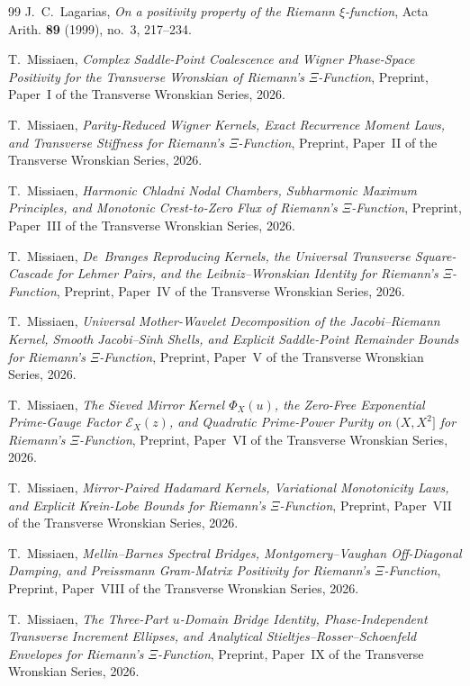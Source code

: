 \documentclass[11pt,reqno]{amsart}
\theoremstyle{definition}
\theoremstyle{remark}
\numberwithin{equation}{section}
\begin{document}
\begin{thebibliography}{99}
J.~C.~Lagarias,
\emph{On a positivity property of the Riemann $\xi$-function},
Acta Arith. \textbf{89} (1999), no.~3, 217--234.

T.~Missiaen,
\emph{Complex Saddle-Point Coalescence and Wigner Phase-Space Positivity for the Transverse Wronskian of Riemann's $\Xi$-Function},
Preprint, Paper~I of the Transverse Wronskian Series, 2026.

T.~Missiaen,
\emph{Parity-Reduced Wigner Kernels, Exact Recurrence Moment Laws, and Transverse Stiffness for Riemann's $\Xi$-Function},
Preprint, Paper~II of the Transverse Wronskian Series, 2026.

T.~Missiaen,
\emph{Harmonic Chladni Nodal Chambers, Subharmonic Maximum Principles, and Monotonic Crest-to-Zero Flux of Riemann's $\Xi$-Function},
Preprint, Paper~III of the Transverse Wronskian Series, 2026.

T.~Missiaen,
\emph{De~Branges Reproducing Kernels, the Universal Transverse Square-Cascade for Lehmer Pairs, and the Leibniz--Wronskian Identity for Riemann's $\Xi$-Function},
Preprint, Paper~IV of the Transverse Wronskian Series, 2026.

T.~Missiaen,
\emph{Universal Mother-Wavelet Decomposition of the Jacobi--Riemann Kernel, Smooth Jacobi--Sinh Shells, and Explicit Saddle-Point Remainder Bounds for Riemann's $\Xi$-Function},
Preprint, Paper~V of the Transverse Wronskian Series, 2026.

T.~Missiaen,
\emph{The Sieved Mirror Kernel $\Phi_X(u)$, the Zero-Free Exponential Prime-Gauge Factor $\mathcal{E}_X(z)$, and Quadratic Prime-Power Purity on $(X, X^2]$ for Riemann's $\Xi$-Function},
Preprint, Paper~VI of the Transverse Wronskian Series, 2026.

T.~Missiaen,
\emph{Mirror-Paired Hadamard Kernels, Variational Monotonicity Laws, and Explicit Krein-Lobe Bounds for Riemann's $\Xi$-Function},
Preprint, Paper~VII of the Transverse Wronskian Series, 2026.

T.~Missiaen,
\emph{Mellin--Barnes Spectral Bridges, Montgomery--Vaughan Off-Diagonal Damping, and Preissmann Gram-Matrix Positivity for Riemann's $\Xi$-Function},
Preprint, Paper~VIII of the Transverse Wronskian Series, 2026.

T.~Missiaen,
\emph{The Three-Part $u$-Domain Bridge Identity, Phase-Independent Transverse Increment Ellipses, and Analytical Stieltjes--Rosser--Schoenfeld Envelopes for Riemann's $\Xi$-Function},
Preprint, Paper~IX of the Transverse Wronskian Series, 2026.


\end{thebibliography}
\end{document}

